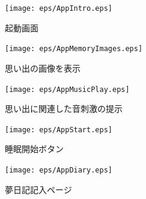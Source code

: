 \begin{figure}[htbp]
 \begin{minipage}{0.45\hsize}
  \begin{center}
   \texttt{[image: eps/AppIntro.eps]}
  \end{center}
  \caption{起動画面}
  \label{le01}
 \end{minipage}
 \begin{minipage}{0.45\hsize}
  \begin{center}
   \texttt{[image: eps/AppMemoryImages.eps]}
  \end{center}
  \caption{思い出の画像を表示}
  \label{le02}
 \end{minipage}
\end{figure}

\begin{figure}[htbp]
 \begin{minipage}{0.45\hsize}
  \begin{center}
   \texttt{[image: eps/AppMusicPlay.eps]}
  \end{center}
  \caption{思い出に関連した音刺激の提示}
  \label{le03}
 \end{minipage}
 \begin{minipage}{0.45\hsize}
  \begin{center}
   \texttt{[image: eps/AppStart.eps]}
  \end{center}
  \caption{睡眠開始ボタン}
  \label{le04}
 \end{minipage}
\end{figure}

\begin{figure}[htbp]
 \begin{minipage}{0.45\hsize}
  \begin{center}
   \texttt{[image: eps/AppDiary.eps]}
  \end{center}
  \caption{夢日記記入ページ}
  \label{le05}
 \end{minipage}
 \begin{minipage}{0.45\hsize}
 \end{minipage}
\end{figure}
